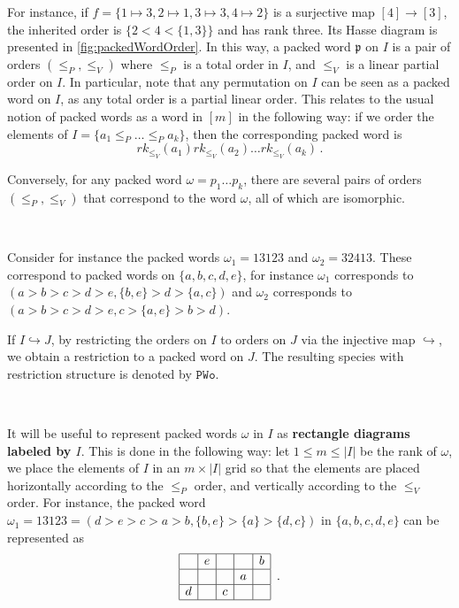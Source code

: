 \documentclass[12pt, reqno]{amsart}
\theoremstyle{definition}
\begin{document}
For instance, if $f = \{ 1\mapsto 3, 2\mapsto 1, 3\mapsto 3, 4\mapsto 2\}$ is a surjective map $[4]\to[3]$, the inherited order is $\{2 < 4 < \{1, 3  \}\}$ and has rank three.
Its Hasse diagram is presented in \cref{fig:packedWordOrder}.
In this way, a packed word $\mathfrak{p}$ on $I$ is a pair of orders $(\leq_P, \leq_V)$ where $\leq_P$ is a total order in $I$, and $\leq_V$ is a linear partial order on $I$.
In particular, note that any permutation on $I$ can be seen as a packed word on $I$, as any total order is a partial linear order.
This relates to the usual notion of packed words as a word in $[m]$ in the following way:
if we order the elements of $I = \{a_1 \leq_P \dots \leq_P a_k \}$, then the corresponding packed word is 
$$rk_{\leq_V}(a_1)rk_{\leq_V}(a_2) \dots rk_{\leq_V}(a_k) \, .$$

Conversely, for any packed word $\omega = p_1\dots p_k$, there are several pairs of orders $(\leq_P, \leq_V)$ that correspond to the word $\omega $, all of which are isomorphic.

\

Consider for instance the packed words $\omega_1 = 13123$ and $\omega_2 = 32413$.
These correspond to packed words on $\{a, b, c, d, e\}$, for instance $\omega_1$ corresponds to $(a > b > c > d > e, \{b, e\} > d > \{a, c\})$ and $\omega_2$ corresponds to $(a > b > c > d > e, c > \{a, e\} >  b > d)$.


If $I \hookrightarrow J$, by restricting the orders on $I$ to orders on $J$ via the injective map $\hookrightarrow $, we obtain a restriction to a packed word on $J$.
The resulting species with restriction structure is denoted by $\mathtt{PWo}$.

\

It will be useful to represent packed words $\omega $ in $I$ as \textbf{rectangle diagrams labeled by $I$}.
This is done in the following way: let $1\leq m \leq |I|$ be the rank of $\omega$, we place the elements of $I$ in an $m \times |I|$ grid so that the elements are placed horizontally according to the $\leq_P$ order, and vertically according to the $\leq_V$ order.
For instance, the packed word $\omega_1 = 13123 = ( d > e > c > a > b, \{b, e\} > \{a\} > \{d, c\})$ in $\{a, b, c, d, e\}$ can be represented as 
\begin{equation}
\begin{array}{|c|c|c|c|c|}
	\hline   & e &   &   & b \\
    \hline   &   &   & a &   \\
    \hline d &   & c &   &   \\
    \hline 
\end{array}\, \, \, .
\end{equation}
\end{document}
